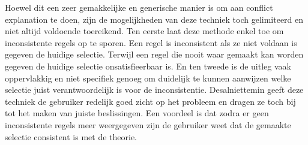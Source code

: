 Hoewel dit een zeer gemakkelijke en generische manier is om aan conflict explanation te doen, zijn de mogelijkheden van deze techniek toch gelimiteerd en niet altijd voldoende toereikend. Ten eerste laat 
deze methode enkel toe om inconsistente regels op te sporen. Een regel is inconsistent als ze niet voldaan is gegeven de huidige selectie. Terwijl een regel die nooit waar gemaakt kan worden gegeven de huidige selectie onsatisfieerbaar is. En ten tweede is de uitleg vaak oppervlakkig en niet specifiek genoeg om duidelijk te kunnen aanwijzen welke selectie juist verantwoordelijk is voor de inconsistentie. 
Desalniettemin geeft deze techniek de gebruiker redelijk goed zicht op het probleem en dragen ze toch bij tot het maken van juiste beslissingen. Een voordeel is dat zodra er geen inconsistente regels meer weergegeven zijn de gebruiker weet dat de gemaakte selectie consistent is met de theorie. 

